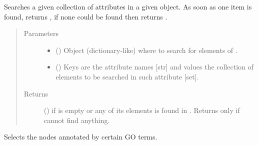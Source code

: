 \documentclass[letterpaper,10pt,english]{sphinxmanual}
\begin{document}
\begin{fulllineitems}
\begin{fulllineitems}
\label{\detokenize{main:pypath.main.PyPath.search_attr_or}}
Searches a given collection of attributes in a given object. As
soon as one item is found, returns , if none could be
found then returns .
\begin{quote}\begin{description}
\item[{Parameters}] \leavevmode\begin{itemize}
\item {} 
 () \textendash{} Object (dictionary-like) where to search for elements of
.

\item {} 
 () \textendash{} Keys are the attribute names {[}str{]} and values the collection
of elements to be searched in such attribute {[}set{]}.

\end{itemize}

\item[{Returns}] \leavevmode
() \textendash{}  if  is empty or any of its
elements is found in . Returns only  if cannot
find anything.

\end{description}\end{quote}

\end{fulllineitems}


\begin{fulllineitems}
\label{\detokenize{main:pypath.main.PyPath.second_neighbours}}
\end{fulllineitems}


\begin{fulllineitems}
\label{\detokenize{main:pypath.main.PyPath.select_by_go}}
Selects the nodes annotated by certain GO terms.


\end{fulllineitems}
\end{fulllineitems}
\end{document}
